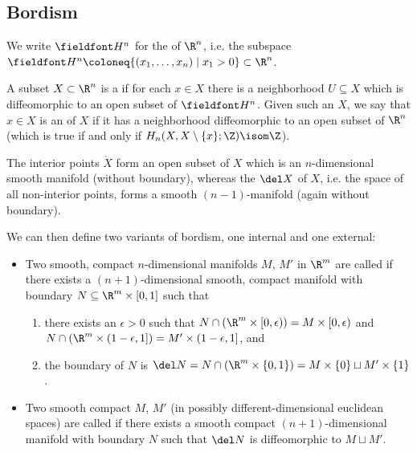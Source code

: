 \subsection{Bordism}
We write $\H^n$ for the  of $\R^n$, i.e. the subspace $\H^n \coloneq \{(x_1, \ldots, x_n) \mid x_1 > 0\} \subset \R^n$.
\begin{definition}
	A subset $X \subset \R^n$ is a  if for each $x \in X$ there is a neighborhood $U \subseteq X$ which is diffeomorphic to an open subset of $\H^n$.
	Given such an $X$, we say that $x \in X$ is an  of $X$ if it has a neighborhood diffeomorphic to an open subset of $\R^n$ (which is true if and only if $H_n(X, X \setminus \{x\}; \Z) \isom \Z$).

	The interior points $\mathring{X}$ form an open subset of $X$ which is an $n$-dimensional smooth manifold (without boundary), whereas the  $\del X$ of $X$, i.e. the space of all non-interior points, forms a smooth $(n - 1)$-manifold (again without boundary).
\end{definition}

We can then define two variants of bordism, one internal and one external:
\begin{definition}
	\leavevmode
	\begin{itemize}
		\item Two smooth, compact $n$-dimensional manifolds $M$, $M'$ in $\R^m$ are called  if there exists a $(n + 1)$-dimensional smooth, compact manifold with boundary $N \subseteq \R^m \times [0, 1]$ such that
			\begin{enumerate}
				\item there exists an $\epsilon > 0$ such that $N \cap (\R^m \times [0, \epsilon)) = M \times [0, \epsilon)$ and $N \cap (\R^m \times (1 - \epsilon, 1]) = M' \times (1 - \epsilon, 1]$, and
				\item the boundary of $N$ is $\del N = N \cap (\R^m \times \{0, 1\}) = M \times \{0\} \sqcup M' \times \{1\}$.
			\end{enumerate}
		\item Two smooth compact $M$, $M'$ (in possibly different-dimensional euclidean spaces) are called  if there exists a smooth compact $(n + 1)$-dimensional manifold with boundary $N$ such that $\del N$ is diffeomorphic to $M \sqcup M'$.
	\end{itemize}
\end{definition}

